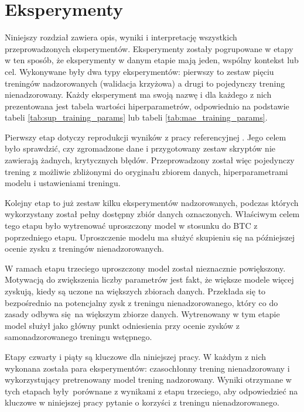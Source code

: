 \chapter{Eksperymenty} \label{chapter:experiments}

Niniejszy rozdział zawiera opis, wyniki i interpretację wszystkich przeprowadzonych eksperymentów. Eksperymenty zostały pogrupowane w etapy w ten sposób, że eksperymenty w danym etapie mają jeden, wspólny kontekst lub cel. Wykonywane były dwa typy eksperymentów: pierwszy to zestaw pięciu treningów nadzorowanych (walidacja krzyżowa) a drugi to pojedynczy trening nienadzorowany. Każdy eksperyment ma swoją nazwę i dla każdego z nich prezentowana jest tabela wartości hiperparametrów, odpowiednio na podstawie tabeli \ref{tab:sup_training_params} lub tabeli \ref{tab:mae_training_params}.

Pierwszy etap dotyczy reprodukcji wyników z pracy referencyjnej \cite{park_bi-directional_2019}. Jego celem było sprawdzić, czy zgromadzone dane i przygotowany zestaw skryptów nie zawierają żadnych, krytycznych błędów. Przeprowadzony został więc pojedynczy trening z możliwie zbliżonymi do oryginału zbiorem danych, hiperparametrami modelu i ustawieniami treningu.

Kolejny etap to już zestaw kilku eksperymentów nadzorowanych, podczas których wykorzystany został pełny dostępny zbiór danych oznaczonych. Właściwym celem tego etapu było wytrenować uproszczony model w stosunku do BTC z poprzedniego etapu. Uproszczenie modelu ma służyć skupieniu się na późniejszej ocenie zysku z treningów nienadzorowanych.

W ramach etapu trzeciego uproszczony model został nieznacznie powiększony. Motywacją do zwiększenia liczby parametrów jest fakt, że większe modele więcej zyskują, kiedy są uczone na większych zbiorach danych. Przekłada się to bezpośrednio na potencjalny zysk z treningu nienadzorowanego, który co do zasady odbywa się na większym zbiorze danych. Wytrenowany w tym etapie model służył jako główny punkt odniesienia przy ocenie zysków z samonadzorowanego treningu wstępnego.

Etapy czwarty i piąty są kluczowe dla niniejszej pracy. W każdym z nich wykonana została para eksperymentów: czasochłonny trening nienadzorowany i wykorzystujący pretrenowany model trening nadzorowany. Wyniki otrzymane w tych etapach były porównane z wynikami z etapu trzeciego, aby odpowiedzieć na kluczowe w niniejszej pracy pytanie o korzyści z treningu nienadzorowanego.

